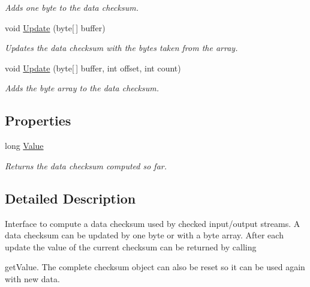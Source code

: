 \begin{DoxyCompactItemize}
\begin{DoxyCompactList}\small\item\em Adds one byte to the data checksum. \end{DoxyCompactList}\item 
void \hyperlink{interface_i_c_sharp_code_1_1_sharp_zip_lib_1_1_checksums_1_1_i_checksum_aee26d2b3705b22ab24cc9b5eb9dbc81d}{Update} (byte\mbox{[}$\,$\mbox{]} buffer)
\begin{DoxyCompactList}\small\item\em Updates the data checksum with the bytes taken from the array. \end{DoxyCompactList}\item 
void \hyperlink{interface_i_c_sharp_code_1_1_sharp_zip_lib_1_1_checksums_1_1_i_checksum_ae9f746b719a279125fd42e4d89f198dd}{Update} (byte\mbox{[}$\,$\mbox{]} buffer, int offset, int count)
\begin{DoxyCompactList}\small\item\em Adds the byte array to the data checksum. \end{DoxyCompactList}\end{DoxyCompactItemize}
\subsection*{Properties}
\begin{DoxyCompactItemize}
\item 
long \hyperlink{interface_i_c_sharp_code_1_1_sharp_zip_lib_1_1_checksums_1_1_i_checksum_a08553f1178a91606c95e0d4fea4c0997}{Value}
\begin{DoxyCompactList}\small\item\em Returns the data checksum computed so far. \end{DoxyCompactList}\end{DoxyCompactItemize}


\subsection{Detailed Description}
Interface to compute a data checksum used by checked input/output streams. A data checksum can be updated by one byte or with a byte array. After each update the value of the current checksum can be returned by calling 

{\ttfamily get\+Value}. The complete checksum object can also be reset so it can be used again with new data. 

